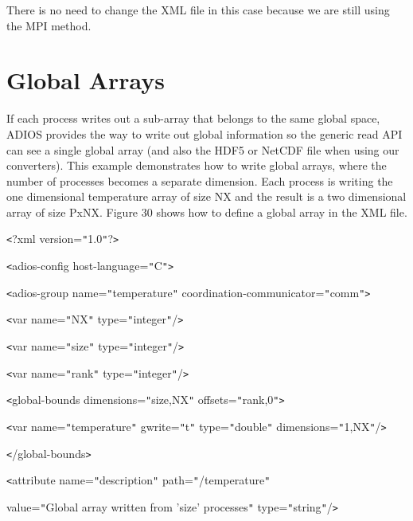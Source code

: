 There is no need to change the XML file in this case because we are still using 
the MPI method. \label{HToc84890299}\label{HToc212016675}\label{HToc212016917}\label{HRef119999389}\label{HToc182553447}

\section{Global Arrays}
\label{section-globalarrays}

If each process writes out a sub-array that belongs to the same global space, ADIOS 
provides the way to write out global information so the generic read API can see 
a single global array (and also the HDF5 or NetCDF file when using our converters). 
This example demonstrates how to write global arrays, where the number of processes 
becomes a separate dimension. Each process is writing the one dimensional temperature 
array of size NX and the result is a two dimensional array of size PxNX. Figure 
30 shows how to define a global array in the XML file. 

\texttt{<}?xml version=\texttt{"}1.0\texttt{"}?\texttt{>}

\texttt{<}adios-config host-language=\texttt{"}C\texttt{"}\texttt{>}

\parindent=14pt
\texttt{<}adios-group name=\texttt{"}temperature\texttt{"} coordination-communicator=\texttt{"}comm\texttt{"}\texttt{>}

\parindent=28pt
\texttt{<}var name=\texttt{"}NX\texttt{"} type=\texttt{"}integer\texttt{"}/\texttt{>}

\texttt{<}var name=\texttt{"}size\texttt{"} type=\texttt{"}integer\texttt{"}/\texttt{>}

\parindent=57pt
\texttt{<}var name=\texttt{"}rank\texttt{"} type=\texttt{"}integer\texttt{"}/\texttt{>}

\parindent=0pt
{\color{color02} \texttt{<}global-bounds dimensions=\texttt{"}size,NX\texttt{"} 
offsets=\texttt{"}rank,0\texttt{"}\texttt{>}}

\parindent=7pt
{\color{color02} \texttt{<}var name=\texttt{"}temperature\texttt{"} gwrite=\texttt{"}t\texttt{"} 
type=\texttt{"}double\texttt{"} dimensions=\texttt{"}1,NX\texttt{"}/\texttt{>}}

\parindent=0pt
{\color{color02} \texttt{<}/global-bounds\texttt{>}}

\parindent=28pt
\texttt{<}attribute name=\texttt{"}description\texttt{"} path=\texttt{"}/temperature\texttt{"}

\parindent=72pt
value=\texttt{"}Global array written from 'size' processes\texttt{"} type=\texttt{"}string\texttt{"}/\texttt{>}

